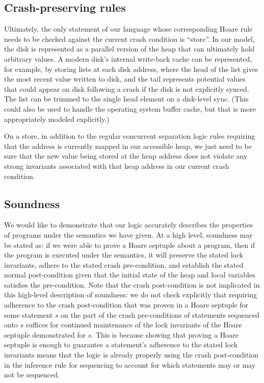 \subsection{Crash-preserving rules}

Ultimately, the only statement of our language whose corresponding Hoare rule
needs to be checked against the current crash condition is ``store''.
In our
model, the disk is represented as a parallel version of the heap that can
ultimately hold arbitrary values.
A modern disk's internal write-back cache can be represented, for
example, by storing lists at each disk address, where the head of the list gives
the most recent value written to disk, and the tail represents potential values
that could appear on disk following a crash if the disk is not explicitly synced.
The list can be trimmed to the single head element on a disk-level sync.
(This could also be used to handle the operating system buffer cache,
but that is more appropriately modeled explicitly.)

On a store, in addition to the regular concurrent separation logic rules
requiring that the address is currently mapped in our accessible heap, we just need to
be sure that the new value being stored at the heap address does not violate any
strong invariants associated with that heap
address in our current crash condition.

\subsection{Soundness}
We would like to demonstrate that our logic accurately describes the properties
of programs under the semantics we have given.
At a high level, soundness may
be stated as: if we were able to prove a Hoare septuple about a program,
then if the program is executed under the semantics,
it will preserve the stated lock invariants,
adhere to the stated crash pre-condition,
and establish the stated normal post-condition
given that the initial state of the heap and local variables
satisfies the pre-condition.
Note that the crash post-condition is not implicated in this high-level
description of soundness:
we do not check explicitly that requiring adherence to the crash post-condition
that was proven in a Hoare septuple for some statement $s$
on the part of the crash pre-conditions of statements sequenced onto $s$
suffices for continued maintenance of the lock invariants
of the Hoare septuple demonstrated for $s$.
This is because showing that proving a Hoare septuple is enough
to guarantee a statement's adherence to the stated lock invariants
means that the logic is already properly using the crash post-condition
in the inference rule for sequencing
to account for which statements may or may not be sequenced.

